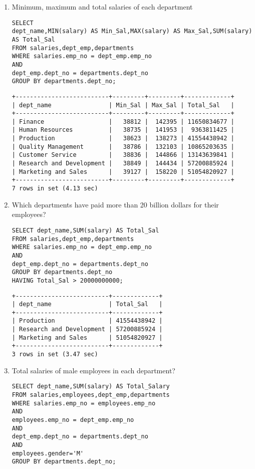 \documentclass[]{article}
\begin{document}
\begin{enumerate}
\item Minimum, maximum and total salaries of each department

\begin{verbatim}
SELECT 
dept_name,MIN(salary) AS Min_Sal,MAX(salary) AS Max_Sal,SUM(salary) AS Total_Sal 
FROM salaries,dept_emp,departments
WHERE salaries.emp_no = dept_emp.emp_no
AND
dept_emp.dept_no = departments.dept_no
GROUP BY departments.dept_no;
\end{verbatim}
	
\begin{verbatim}
+--------------------------+---------+---------+-------------+
| dept_name                | Min_Sal | Max_Sal | Total_Sal   |
+--------------------------+---------+---------+-------------+
| Finance                  |   38812 |  142395 | 11650834677 |
| Human Resources          |   38735 |  141953 |  9363811425 |
| Production               |   38623 |  138273 | 41554438942 |
| Quality Management       |   38786 |  132103 | 10865203635 |
| Customer Service         |   38836 |  144866 | 13143639841 |
| Research and Development |   38849 |  144434 | 57200885924 |
| Marketing and Sales      |   39127 |  158220 | 51054820927 |
+--------------------------+---------+---------+-------------+
7 rows in set (4.13 sec)
\end{verbatim}	

\item Which departments have paid more than 20 billion dollars for their employees?

\begin{verbatim}
SELECT dept_name,SUM(salary) AS Total_Sal 
FROM salaries,dept_emp,departments
WHERE salaries.emp_no = dept_emp.emp_no
AND
dept_emp.dept_no = departments.dept_no
GROUP BY departments.dept_no
HAVING Total_Sal > 20000000000;
\end{verbatim}	

\begin{verbatim}
+--------------------------+-------------+
| dept_name                | Total_Sal   |
+--------------------------+-------------+
| Production               | 41554438942 |
| Research and Development | 57200885924 |
| Marketing and Sales      | 51054820927 |
+--------------------------+-------------+
3 rows in set (3.47 sec)
\end{verbatim}

\item Total salaries of male employees in each department?

\begin{verbatim}
SELECT dept_name,SUM(salary) AS Total_Salary 
FROM salaries,employees,dept_emp,departments
WHERE salaries.emp_no = employees.emp_no
AND
employees.emp_no = dept_emp.emp_no
AND
dept_emp.dept_no = departments.dept_no
AND
employees.gender='M'
GROUP BY departments.dept_no;
\end{verbatim}	


\end{enumerate}
\end{document}
